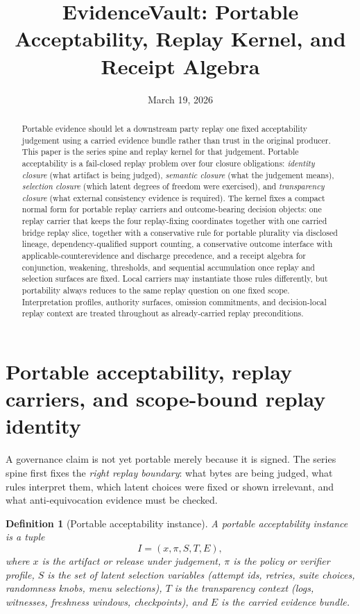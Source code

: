 \documentclass[11pt]{article}
\title{EvidenceVault: Portable Acceptability, Replay Kernel, and Receipt Algebra}
\author{}
\date{March 19, 2026}
\newtheorem{definition}{Definition}
\theoremstyle{remark}
\begin{document}
\maketitle

\begin{abstract}
Portable evidence should let a downstream party replay one fixed acceptability judgement
using a carried evidence bundle rather than trust in the original producer. This paper is the series spine and replay kernel for that judgement.
Portable acceptability is a fail-closed replay problem over four closure obligations: \emph{identity closure}
(what artifact is being judged), \emph{semantic closure} (what the judgement means), \emph{selection closure}
(which latent degrees of freedom were exercised), and \emph{transparency closure} (what external consistency evidence is required).
The kernel fixes a compact normal form for portable replay carriers and outcome-bearing decision objects: one replay carrier that keeps the four replay-fixing coordinates together with one carried bridge replay slice, together with a conservative rule for portable plurality via disclosed lineage, dependency-qualified support counting, a conservative outcome interface with applicable-counterevidence and discharge precedence, and a receipt algebra for conjunction, weakening, thresholds, and sequential accumulation once replay and selection surfaces are fixed.
Local carriers may instantiate those rules differently, but portability always reduces to the same replay question on one fixed scope.
Interpretation profiles, authority surfaces, omission commitments, and decision-local replay context are treated throughout as already-carried replay preconditions.
\end{abstract}

\section{Portable acceptability, replay carriers, and scope-bound replay identity}
A governance claim is not yet portable merely because it is signed. The series spine first fixes the \emph{right replay boundary}:
what bytes are being judged, what rules interpret them, which latent choices were fixed or shown irrelevant, and what anti-equivocation evidence must be checked.

\begin{definition}[Portable acceptability instance]
A portable acceptability instance is a tuple
\[
I=(x,\pi,S,T,E),
\]
where $x$ is the artifact or release under judgement, $\pi$ is the policy or verifier profile, $S$ is the set of latent selection variables
(attempt ids, retries, suite choices, randomness knobs, menu selections), $T$ is the transparency context (logs, witnesses, freshness windows,
checkpoints), and $E$ is the carried evidence bundle.
\end{definition}
\end{document}
